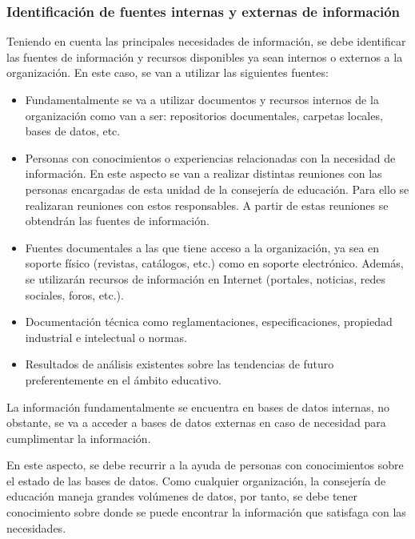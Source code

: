 \subsubsection{Identificación de fuentes internas y externas de información}
Teniendo en cuenta las principales necesidades de información, se debe identificar las fuentes de información y recursos disponibles ya sean internos o externos a la organización. En este caso, se van a utilizar las siguientes fuentes:
\begin{itemize}
	\item Fundamentalmente se va a utilizar documentos y recursos internos de la organización como van a ser: repositorios documentales, carpetas locales, bases de datos, etc.
	\item Personas con conocimientos o experiencias relacionadas con la necesidad de información. En este aspecto se van a realizar distintas reuniones con las personas encargadas de esta unidad de la consejería de educación. Para ello se realizaran reuniones con estos responsables. A partir de estas reuniones se obtendrán las fuentes de información.
	\item Fuentes documentales a las que tiene acceso a la organización, ya sea en soporte físico (revistas, catálogos, etc.) como en soporte electrónico. Además, se utilizarán recursos de información en Internet (portales, noticias, redes sociales, foros, etc.). 
	\item Documentación técnica como reglamentaciones, especificaciones, propiedad industrial e intelectual o normas.
	\item Resultados de análisis existentes sobre las tendencias de futuro preferentemente en el ámbito educativo.
\end{itemize}


La información fundamentalmente se encuentra en bases de datos internas, no obstante, se va a acceder a bases de datos externas en caso de necesidad para cumplimentar la información. 

En este aspecto, se debe recurrir a la ayuda de personas con conocimientos sobre el estado de las bases de datos. Como cualquier organización, la consejería de educación maneja grandes volúmenes de datos, por tanto, se debe tener conocimiento sobre donde se puede encontrar la información que satisfaga con las necesidades. 

